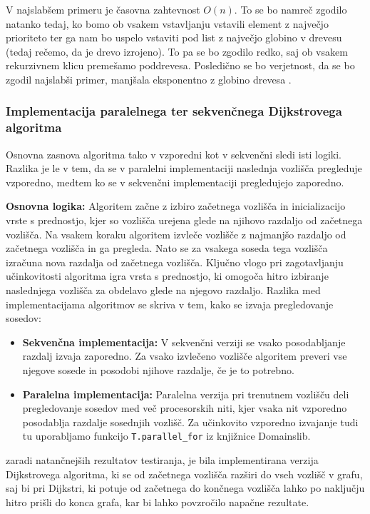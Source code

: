 \documentclass[mat1, tisk]{fmfdelo}
\begin{document}
V najslabšem primeru je časovna zahtevnost $O(n)$. To se bo namreč zgodilo natanko tedaj, ko bomo ob vsakem vstavljanju
vstavili element z največjo prioriteto ter ga nam bo uspelo vstaviti pod list z največjo globino v drevesu (tedaj
rečemo, da je drevo izrojeno). To pa se bo zgodilo redko, saj ob vsakem rekurzivnem klicu premešamo poddrevesa.
Posledično se bo verjetnost, da se bo zgodil najslabši primer, manjšala eksponentno z globino drevesa \cite{okasaki1996}.

\subsubsection{Implementacija paralelnega ter sekvenčnega Dijkstrovega algoritma}

Osnovna zasnova algoritma tako v vzporedni kot v sekvenčni sledi isti logiki. Razlika je le v tem, da se v paralelni
implementaciji naslednja vozlišča pregleduje vzporedno, medtem ko se v sekvenčni implementaciji pregledujejo zaporedno.

\textbf{Osnovna logika: } Algoritem začne z izbiro začetnega vozlišča in inicializacijo vrste s prednostjo, kjer so
vozlišča urejena glede na njihovo razdaljo od začetnega vozlišča. Na vsakem koraku algoritem izvleče vozlišče z najmanjšo
razdaljo od začetnega vozlišča in ga pregleda. Nato se za vsakega soseda tega vozlišča izračuna nova razdalja od začetnega
vozlišča. Ključno vlogo pri zagotavljanju učinkovitosti algoritma igra vrsta s prednostjo, ki omogoča hitro izbiranje
naslednjega vozlišča za obdelavo glede na njegovo razdaljo. Razlika med implementacijama algoritmov se skriva v tem,
kako se izvaja pregledovanje sosedov:

\begin{itemize}
  \item \textbf{Sekvenčna implementacija: } V sekvenčni verziji se vsako posodabljanje razdalj izvaja zaporedno.
    Za vsako izvlečeno vozlišče algoritem preveri vse njegove sosede in posodobi njihove razdalje, če je to potrebno.
  \item \textbf{Paralelna implementacija: } Paralelna verzija pri trenutnem vozlišču deli pregledovanje sosedov med
    več procesorskih niti, kjer vsaka nit vzporedno posodablja razdalje sosednjih vozlišč. Za učinkovito vzporedno
    izvajanje tudi tu uporabljamo funkcijo \texttt{T.parallel\_for} iz knjižnice Domainslib.
\end{itemize}

zaradi natančnejših rezultatov testiranja, je bila implementirana verzija Dijkstrovega algoritma, ki se od začetnega vozlišča
razširi do vseh vozlišč v grafu, saj bi pri Dijkstri, ki potuje od začetnega do končnega vozlišča lahko po naključju
hitro prišli do konca grafa, kar bi lahko povzročilo napačne rezultate.
\end{document}
